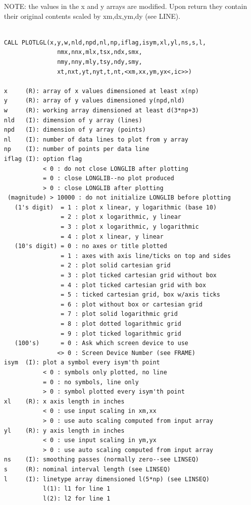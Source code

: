 \documentclass[11pt]{report}
\begin{document}
NOTE: the values in the x and y arrays are modified.  Upon return they
contain their original contents scaled by xm,dx,ym,dy (see LINE).
\begin{verbatim}

CALL PLOTLGL(x,y,w,nld,npd,nl,np,iflag,isym,xl,yl,ns,s,l,
               nmx,nnx,mlx,tsx,ndx,smx,
               nmy,nny,mly,tsy,ndy,smy,
               xt,nxt,yt,nyt,t,nt,<xm,xx,ym,yx<,ic>>)

x     (R): array of x values dimensioned at least x(np)
y     (R): array of y values dimensioned y(npd,nld)
w     (R): working array dimensioned at least d(3*np+3)
nld   (I): dimension of y array (lines)
npd   (I): dimension of y array (points)
nl    (I): number of data lines to plot from y array
np    (I): number of points per data line
iflag (I): option flag
           < 0 : do not close LONGLIB after plotting
           = 0 : close LONGLIB--no plot produced
           > 0 : close LONGLIB after plotting
 (magnitude) > 10000 : do not initialize LONGLIB before plotting
   (1's digit)  = 1 : plot x linear, y logarithmic (base 10)
                = 2 : plot x logarithmic, y linear
                = 3 : plot x logarithmic, y logarithmic
                = 4 : plot x linear, y linear
   (10's digit) = 0 : no axes or title plotted
                = 1 : axes with axis line/ticks on top and sides
                = 2 : plot solid cartesian grid
                = 3 : plot ticked cartesian grid without box
                = 4 : plot ticked cartesian grid with box
                = 5 : ticked cartesian grid, box w/axis ticks
                = 6 : plot without box or cartesian grid
                = 7 : plot solid logarithmic grid
                = 8 : plot dotted logarithmic grid
                = 9 : plot ticked logarithmic grid
   (100's)      = 0 : Ask which screen device to use
               <> 0 : Screen Device Number (see FRAME)
isym  (I): plot a symbol every isym'th point
           < 0 : symbols only plotted, no line
           = 0 : no symbols, line only
           > 0 : symbol plotted every isym'th point
xl    (R): x axis length in inches
           < 0 : use input scaling in xm,xx
           > 0 : use auto scaling computed from input array
yl    (R): y axis length in inches
           < 0 : use input scaling in ym,yx
           > 0 : use auto scaling computed from input array
ns    (I): smoothing passes (normally zero--see LINSEQ)
s     (R): nominal interval length (see LINSEQ)
l     (I): linetype array dimensioned l(5*np) (see LINSEQ)
           l(1): l1 for line 1
           l(2): l2 for line 1

\end{verbatim}
\end{document}
